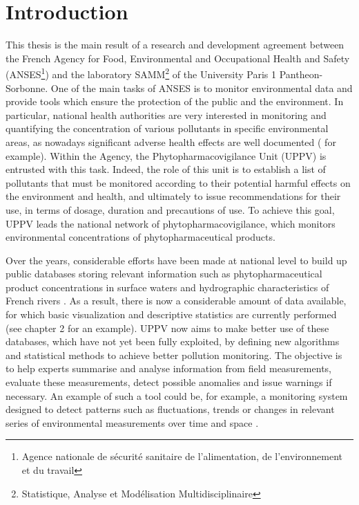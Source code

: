 \chapter{Introduction}\label{chp:1}

This thesis is the  main  result  of  a  research  and  development  agreement  between  the  French Agency for Food, Environmental and Occupational Health and Safety (ANSES\footnote{Agence nationale de sécurité sanitaire de l'alimentation, de l'environnement et du travail}) and the laboratory SAMM\footnote{Statistique, Analyse et Modélisation Multidisciplinaire} of the University Paris 1 Pantheon-Sorbonne.  One of the main tasks of ANSES is to monitor environmental data and provide tools which ensure the protection of the public and the environment.  In particular, national health authorities are very interested in monitoring and quantifying the concentration of various pollutants in specific environmental areas, as nowadays significant adverse health effects are well documented (\cite{khopkar2007,Marchant2018,NOUGADERE201432} for example). Within the Agency, the Phytopharmacovigilance Unit (UPPV) is entrusted with this task.  Indeed, the role of this unit is to establish a list of pollutants that must be monitored according to their potential harmful effects on the environment and health, and ultimately to issue recommendations for their use, in terms of dosage, duration and precautions of use. To achieve this goal, UPPV leads the national network of phytopharmacovigilance, which monitors environmental concentrations of phytopharmaceutical products.

Over the years, considerable efforts have been made at national level to build up public databases storing relevant information such as phytopharmaceutical product concentrations in surface waters \citep{Naiade} and hydrographic characteristics of French rivers \citep{IGN:BD:TOPO}. As a result, there is now a considerable amount of data available, for which basic visualization and descriptive statistics are currently performed (see chapter 2 for an example). UPPV now aims to  make better use of these databases, which have not yet been fully exploited,  by  defining  new  algorithms  and  statistical methods  to  achieve  better  pollution  monitoring.  The objective  is  to  help  experts summarise and  analyse  information  from  field  measurements, evaluate  these  measurements, detect possible  anomalies and issue  warnings if necessary. An example of such a tool  could be, for example, a monitoring system designed to detect patterns  such  as  fluctuations,  trends  or changes in relevant series of environmental measurements over time and space \citep{Manly2008}. \\

